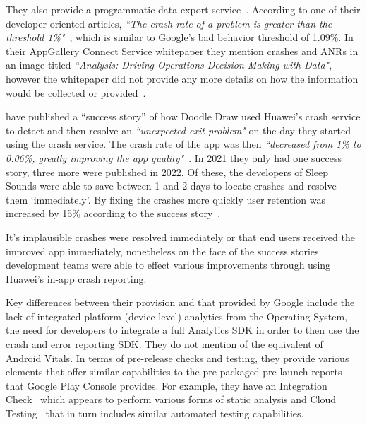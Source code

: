 They also provide a programmatic data export service~. According to one of their developer-oriented articles, \emph{``The crash rate of a problem is greater than the threshold 1\%"}~, which is similar to Google's bad behavior threshold of 1.09\%. In their AppGallery Connect Service whitepaper they mention crashes and ANRs in an image titled \emph{``Analysis: Driving Operations Decision-Making with Data"}, however the whitepaper did not provide any more details on how the information would be collected or provided~. 


 have published a ``success story'' of how Doodle Draw used Huawei's crash service to detect and then resolve an \emph{``unexpected exit problem"} on the day they started using the crash service. The crash rate of the app was then \emph{``decreased from 1\% to 0.06\%, greatly improving the app quality"}~. In 2021 they only had one success story, three more were published in 2022. Of these, the developers of Sleep Sounds were able to save between 1 and 2 days to locate crashes and resolve them `immediately'. By fixing the crashes more quickly user retention was increased by 15\% according to the success story~. 

It's implausible crashes were resolved immediately or that end users received the improved app immediately, nonetheless on the face of the success stories development teams were able to effect various improvements through using Huawei's in-app crash reporting.

Key differences between their provision and that provided by Google include the lack of integrated platform (device-level) analytics from the Operating System, the need for developers to integrate a full Analytics SDK in order to then use the crash and error reporting SDK. They do not mention of the equivalent of Android Vitals. In terms of pre-release checks and testing, they provide various elements that offer similar capabilities to the pre-packaged pre-launch reports that Google Play Console provides. For example, they have an Integration Check~ which appears to perform various forms of static analysis and Cloud Testing~ that in turn includes similar automated testing capabilities. 

